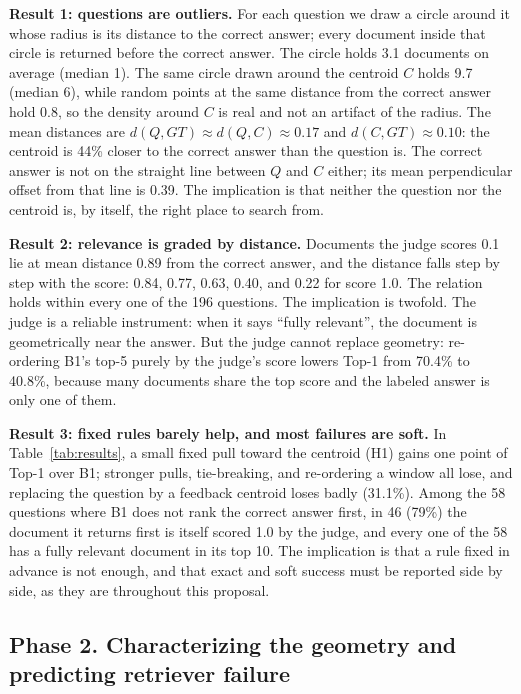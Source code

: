 \documentclass[12pt,a4paper]{article}
\newcommand{\dist}{d}
\begin{document}
\textbf{Result 1: questions are outliers.} For each question we draw a circle around it whose radius is its distance to the correct answer; every document inside that circle is returned before the correct answer. The circle holds 3.1 documents on average (median 1). The same circle drawn around the centroid $C$ holds 9.7 (median 6), while random points at the same distance from the correct answer hold 0.8, so the density around $C$ is real and not an artifact of the radius. The mean distances are $\dist(Q,GT)\approx\dist(Q,C)\approx0.17$ and $\dist(C,GT)\approx0.10$: the centroid is 44\% closer to the correct answer than the question is. The correct answer is not on the straight line between $Q$ and $C$ either; its mean perpendicular offset from that line is 0.39. The implication is that neither the question nor the centroid is, by itself, the right place to search from.

\textbf{Result 2: relevance is graded by distance.} Documents the judge scores 0.1 lie at mean distance 0.89 from the correct answer, and the distance falls step by step with the score: 0.84, 0.77, 0.63, 0.40, and 0.22 for score 1.0. The relation holds within every one of the 196 questions. The implication is twofold. The judge is a reliable instrument: when it says ``fully relevant'', the document is geometrically near the answer. But the judge cannot replace geometry: re-ordering B1's top-5 purely by the judge's score lowers Top-1 from 70.4\% to 40.8\%, because many documents share the top score and the labeled answer is only one of them.

\textbf{Result 3: fixed rules barely help, and most failures are soft.} In Table~\ref{tab:results}, a small fixed pull toward the centroid (H1) gains one point of Top-1 over B1; stronger pulls, tie-breaking, and re-ordering a window all lose, and replacing the question by a feedback centroid loses badly (31.1\%). Among the 58 questions where B1 does not rank the correct answer first, in 46 (79\%) the document it returns first is itself scored 1.0 by the judge, and every one of the 58 has a fully relevant document in its top 10. The implication is that a rule fixed in advance is not enough, and that exact and soft success must be reported side by side, as they are throughout this proposal.

\subsection{Phase 2. Characterizing the geometry and predicting retriever failure}
\end{document}
